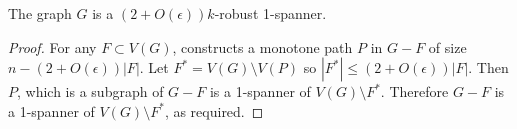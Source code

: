\documentclass{patmorin}
\begin{document}
\begin{cor}
	The graph $G$ is a $(2+O(\epsilon))k$-robust 1-spanner.
\end{cor}

\begin{proof}
	For any $F\subset V(G)$,  constructs a monotone path $P$ in $G-F$ of size $n-(2+O(\epsilon))|F|$.  Let $F^*=V(G)\setminus V(P)$ so $|F^*|\le (2+O(\epsilon))|F|$.  Then $P$, which is a subgraph of $G-F$ is a 1-spanner of $V(G)\setminus F^*$. Therefore $G-F$ is a 1-spanner of $V(G)\setminus F^*$, as required.
\end{proof}
%  
%  
%
%	
%	
%	
%	
%		  
%		  
%		  
%	
%	
%	
%
\end{document}
